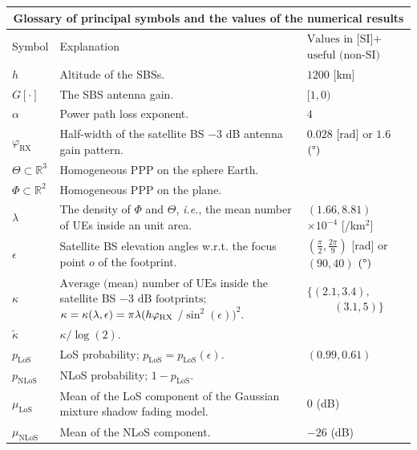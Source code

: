 \documentclass[lettersize,journal]{IEEEtran}
\newcommand{\R}{\mathbb{R}}
\begin{document}
\begin{table}
  \begin{center}
    \begin{tabular}{|p{0.99cm}|p{4.5cm}|p{1.75cm}|}
      \hline
      \multicolumn{3}{|c|}{Glossary of principal symbols and the values of the numerical results} \\
      \hline
      Symbol& Explanation &$\text{Values in [SI]+}$  $\text{useful (non-SI)}$  
      \\ 
      \hline
      $h$ & Altitude of the SBSs. &$1200$ [km]  \\
      $G[\cdot]$ & The SBS antenna gain.& $[1,0)$\\
      $\alpha$ &Power path loss exponent.& $4$\\
      $\varphi_{\text{RX}}$ & Half-width of the satellite BS $-3$ dB antenna gain pattern.&$0.028 \text{ [rad] }$\hfill \break or $1.6$ $(\degree)$  \\
      $\Theta \subset \R^3 $ & Homogeneous PPP on the sphere Earth.& \\
      $\Phi \subset \R^2$ & Homogeneous PPP on the plane. &\\
      $\lambda$ & The density of $\Phi$ and $\Theta$, \textit{i.e.}, the mean number of UEs inside an unit area. & $(1.66,8.81)$  $\times 10^{-4}$ [/km$^2$] \\
      $\epsilon$&  Satellite BS elevation angles w.r.t. the focus point $\textit{o}$ of the footprint.&\footnotesize{$\left(\frac{\pi}{2},\frac{2\pi}{9}\right)$}\footnotesize{ [rad]}\hfill \break \footnotesize{ or $(90,40)$ $(\degree)$} \\
      $\kappa$  & $\text{Average (mean) number of }  \text{UEs inside}$ the satellite BS $-3 \text{ dB footprints};$ \hfill \break $\kappa =\kappa(\lambda,\epsilon) = \pi \lambda (h\varphi_{\textup{RX}}$ $/\sin^2(\epsilon))^2.$& $\{(2.1,3.4),$\hfill \break  $\hspace{1cm} (3.1,5)\}$  \\
      ${\tilde{\kappa}}$ &  $\kappa/\log(2)$.& \\
      $p_{\text{LoS}}$& LoS probability; $p_{\text{LoS}} = p_{\text{LoS}}(\epsilon)$. & $(0.99,0.61)$\\
      $p_{\text{NLoS}}$& NLoS probability; $1-p_{\text{LoS}}$. & \\
      $\mu_{\text{LoS}}$& Mean of the LoS component of the Gaussian mixture shadow fading model. & $0$ (dB) \\
      $\mu_{\text{NLoS}}$& Mean of the NLoS component. & $-26$ (dB) \\

\end{tabular}
\end{center}
\end{table}
\end{document}
